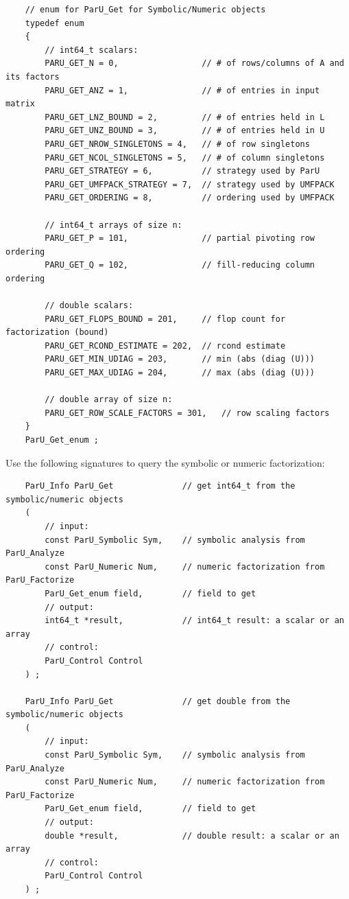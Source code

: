 \documentclass[12pt]{article}
\begin{document}
    {\footnotesize
    \begin{verbatim}
    // enum for ParU_Get for Symbolic/Numeric objects
    typedef enum
    {
        // int64_t scalars:
        PARU_GET_N = 0,                 // # of rows/columns of A and its factors
        PARU_GET_ANZ = 1,               // # of entries in input matrix
        PARU_GET_LNZ_BOUND = 2,         // # of entries held in L
        PARU_GET_UNZ_BOUND = 3,         // # of entries held in U
        PARU_GET_NROW_SINGLETONS = 4,   // # of row singletons
        PARU_GET_NCOL_SINGLETONS = 5,   // # of column singletons
        PARU_GET_STRATEGY = 6,          // strategy used by ParU
        PARU_GET_UMFPACK_STRATEGY = 7,  // strategy used by UMFPACK
        PARU_GET_ORDERING = 8,          // ordering used by UMFPACK

        // int64_t arrays of size n:
        PARU_GET_P = 101,               // partial pivoting row ordering
        PARU_GET_Q = 102,               // fill-reducing column ordering

        // double scalars:
        PARU_GET_FLOPS_BOUND = 201,     // flop count for factorization (bound)
        PARU_GET_RCOND_ESTIMATE = 202,  // rcond estimate
        PARU_GET_MIN_UDIAG = 203,       // min (abs (diag (U)))
        PARU_GET_MAX_UDIAG = 204,       // max (abs (diag (U)))

        // double array of size n:
        PARU_GET_ROW_SCALE_FACTORS = 301,   // row scaling factors
    }
    ParU_Get_enum ; \end{verbatim}}

Use the following signatures to query the symbolic or numeric factorization:

    {\footnotesize
    \begin{verbatim}
    ParU_Info ParU_Get              // get int64_t from the symbolic/numeric objects
    (
        // input:
        const ParU_Symbolic Sym,    // symbolic analysis from ParU_Analyze
        const ParU_Numeric Num,     // numeric factorization from ParU_Factorize
        ParU_Get_enum field,        // field to get
        // output:
        int64_t *result,            // int64_t result: a scalar or an array
        // control:
        ParU_Control Control
    ) ;

    ParU_Info ParU_Get              // get double from the symbolic/numeric objects
    (
        // input:
        const ParU_Symbolic Sym,    // symbolic analysis from ParU_Analyze
        const ParU_Numeric Num,     // numeric factorization from ParU_Factorize
        ParU_Get_enum field,        // field to get
        // output:
        double *result,             // double result: a scalar or an array
        // control:
        ParU_Control Control
    ) ; \end{verbatim}}
\end{document}
